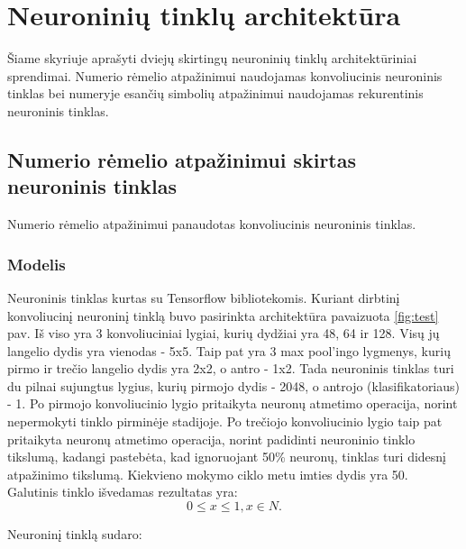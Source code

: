 \documentclass{VUMIFInfBakalaurinis}
\begin{document}
\pagebreak
\section{Neuroninių tinklų architektūra}
Šiame skyriuje aprašyti dviejų skirtingų neuroninių tinklų architektūriniai sprendimai.
Numerio rėmelio atpažinimui naudojamas konvoliucinis neuroninis tinklas bei 
numeryje esančių simbolių atpažinimui naudojamas rekurentinis neuroninis tinklas.

\subsection{Numerio rėmelio atpažinimui skirtas neuroninis tinklas}
Numerio rėmelio atpažinimui panaudotas konvoliucinis neuroninis tinklas.

\subsubsection{Modelis}
Neuroninis tinklas kurtas su Tensorflow bibliotekomis.
Kuriant dirbtinį konvoliucinį neuroninį tinklą buvo pasirinkta architektūra pavaizuota \ref{fig:test} pav.
Iš viso yra 3 konvoliuciniai lygiai, kurių dydžiai yra 48, 64 ir 128\cite{goodfellow2013multi}.
Visų jų langelio dydis yra vienodas - 5x5.
Taip pat yra 3 max pool'ingo lygmenys, kurių pirmo ir trečio langelio dydis yra 2x2, o antro - 1x2.
Tada neuroninis tinklas turi du pilnai sujungtus lygius, kurių pirmojo dydis - 2048, o antrojo (klasifikatoriaus) - 1.
Po pirmojo konvoliucinio lygio pritaikyta neuronų atmetimo operacija, norint nepermokyti tinklo pirminėje stadijoje.
Po trečiojo konvoliucinio lygio taip pat pritaikyta neuronų atmetimo operacija, norint padidinti neuroninio tinklo tikslumą, 
kadangi pastebėta, kad ignoruojant 50\% neuronų, tinklas turi didesnį atpažinimo tikslumą\cite{stark2015captcha}.
Kiekvieno mokymo ciklo metu imties dydis yra 50. Galutinis tinklo išvedamas rezultatas yra:
\begin{equation*}
  0 \leq x \leq 1, x \in N.
\end{equation*}

Neuroninį tinklą sudaro:
\end{document}
